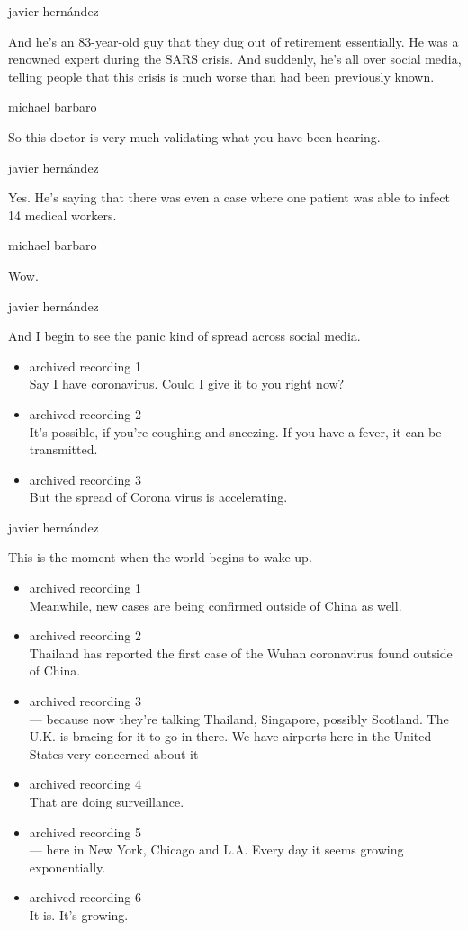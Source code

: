 javier hernández

And he's an 83-year-old guy that they dug out of retirement essentially.
He was a renowned expert during the SARS crisis. And suddenly, he's all
over social media, telling people that this crisis is much worse than
had been previously known.

michael barbaro

So this doctor is very much validating what you have been hearing.

javier hernández

Yes. He's saying that there was even a case where one patient was able
to infect 14 medical workers.

michael barbaro

Wow.

javier hernández

And I begin to see the panic kind of spread across social media.

\begin{itemize}
\item
  archived recording 1\\
  Say I have coronavirus. Could I give it to you right now?
\item
  archived recording 2\\
  It's possible, if you're coughing and sneezing. If you have a fever,
  it can be transmitted.
\item
  archived recording 3\\
  But the spread of Corona virus is accelerating.
\end{itemize}

javier hernández

This is the moment when the world begins to wake up.

\begin{itemize}
\item
  archived recording 1\\
  Meanwhile, new cases are being confirmed outside of China as well.
\item
  archived recording 2\\
  Thailand has reported the first case of the Wuhan coronavirus found
  outside of China.
\item
  archived recording 3\\
  --- because now they're talking Thailand, Singapore, possibly
  Scotland. The U.K. is bracing for it to go in there. We have airports
  here in the United States very concerned about it ---
\item
  archived recording 4\\
  That are doing surveillance.
\item
  archived recording 5\\
  --- here in New York, Chicago and L.A. Every day it seems growing
  exponentially.
\item
  archived recording 6\\
  It is. It's growing.
\end{itemize}

